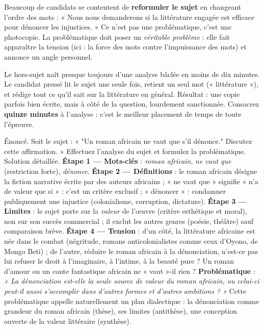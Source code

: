 \documentclass[11pt]{article}
\begin{document}
\begin{attention}
Beaucoup de candidats se contentent de \textbf{reformuler le sujet} en changeant l'ordre des mots : « Nous nous demanderons si la littérature engagée est efficace pour dénoncer les injustices. » Ce n'est pas une problématique, c'est une photocopie. La problématique doit poser un \emph{véritable problème} : elle fait apparaître la tension (ici : la force des mots contre l'impuissance des mots) et annonce un angle personnel.
\end{attention}

\begin{attention}
Le hors-sujet naît presque toujours d'une analyse bâclée en moins de dix minutes. Le candidat pressé lit le sujet une seule fois, retient un seul mot (« littérature »), et rédige tout ce qu'il sait sur la littérature en général. Résultat : une copie parfois bien écrite, mais à côté de la question, lourdement sanctionnée. Consacrez \textbf{quinze minutes} à l'analyse : c'est le meilleur placement de temps de toute l'épreuve.
\end{attention}

\begin{exoresolu}
Énoncé. Soit le sujet : « "Un roman africain ne vaut que s'il dénonce." Discutez cette affirmation. » Effectuez l'analyse du sujet et formulez la problématique.
\tcblower
Solution détaillée.
\textbf{Étape 1 — Mots-clés} : \emph{roman africain}, \emph{ne vaut que} (restriction forte), \emph{dénonce}.
\textbf{Étape 2 — Définitions} : le roman africain désigne la fiction narrative écrite par des auteurs africains ; « ne vaut que » signifie « n'a de valeur que si » : c'est un critère exclusif ; « dénoncer » : condamner publiquement une injustice (colonialisme, corruption, dictature).
\textbf{Étape 3 — Limites} : le sujet porte sur la \emph{valeur} de l'œuvre (critère esthétique et moral), non sur son succès commercial ; il exclut les autres genres (poésie, théâtre) sauf comparaison brève.
\textbf{Étape 4 — Tension} : d'un côté, la littérature africaine est née dans le combat (négritude, romans anticolonialistes comme ceux d'Oyono, de Mongo Beti) ; de l'autre, réduire le roman africain à la dénonciation, n'est-ce pas lui refuser le droit à l'imaginaire, à l'intime, à la beauté pure ? Un roman d'amour ou un conte fantastique africain ne « vaut »-il rien ?
\textbf{Problématique} : \emph{« La dénonciation est-elle la seule source de valeur du roman africain, ou celui-ci peut-il aussi s'accomplir dans d'autres formes et d'autres ambitions ? »}
Cette problématique appelle naturellement un plan dialectique : la dénonciation comme grandeur du roman africain (thèse), ses limites (antithèse), une conception ouverte de la valeur littéraire (synthèse).
\end{exoresolu}
\end{document}
